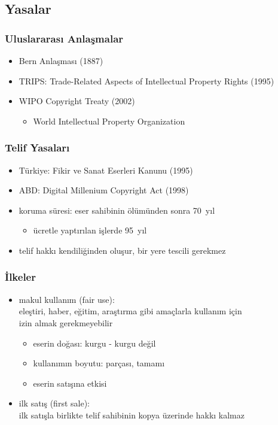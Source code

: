 \documentclass[dvipsnames]{beamer}
\theoremstyle{definition}
\theoremstyle{example}
\theoremstyle{plain}
\begin{document}
\subsection{Yasalar}

\begin{frame}
  \frametitle{Uluslararası Anlaşmalar}

  \begin{itemize}
    \item Bern Anlaşması (1887)
    \item TRIPS: Trade-Related Aspects of Intellectual Property Rights (1995)
    \item WIPO Copyright Treaty (2002)
    \begin{itemize}
      \item World Intellectual Property Organization
    \end{itemize}
  \end{itemize}
\end{frame}

\begin{frame}
  \frametitle{Telif Yasaları}

  \begin{itemize}
    \item Türkiye: Fikir ve Sanat Eserleri Kanunu (1995)
    \item ABD: Digital Millenium Copyright Act (1998)

    \pause
    \medskip
    \item koruma süresi: eser sahibinin ölümünden sonra 70~yıl
    \begin{itemize}
      \item ücretle yaptırılan işlerde 95~yıl
    \end{itemize}

    \pause
    \medskip
    \item telif hakkı kendiliğinden oluşur, bir yere tescili gerekmez
  \end{itemize}
\end{frame}
%

\begin{frame}
  \frametitle{İlkeler}

  \begin{itemize}
    \item \alert{makul kullanım} (fair use):\\
      eleştiri, haber, eğitim, araştırma gibi amaçlarla kullanım için\\
      izin almak gerekmeyebilir
    \begin{itemize}
      \item eserin doğası: kurgu - kurgu değil
      \item kullanımın boyutu: parçası, tamamı
      \item eserin satışına etkisi
    \end{itemize}

    \pause
    \medskip
    \item \alert{ilk satış} (first sale):\\
      ilk satışla birlikte telif sahibinin kopya üzerinde hakkı kalmaz
  \end{itemize}
\end{frame}
\end{document}

